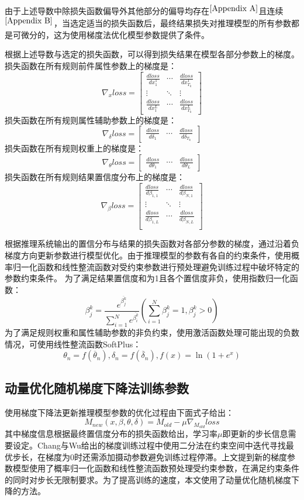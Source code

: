\documentclass{cjc}
\begin{document}
由于上述导数中除损失函数偏导外其他部分的偏导均存在$^{\ref{Appendix A}}$且连续$^{\ref{Appendix B}}$，当选定适当的损失函数后，最终结果损失对推理模型的所有参数都是可微分的，这为使用梯度法优化模型参数提供了条件。

根据上述导数与选定的损失函数，可以得到损失结果在模型各部分参数上的梯度。
损失函数在所有规则前件属性参数上的梯度是：
$$\nabla_{x}loss=\left[\begin{matrix}
            \frac{dloss}{dx_1^1} & \cdots & \frac{dloss}{dx_{T_k}^1} \\
            \vdots               & \ddots & \vdots                   \\
            \frac{dloss}{dx_1^L} & \cdots & \frac{dloss}{dx_{T_k}^L}
        \end{matrix}\right]$$
损失函数在所有规则属性辅助参数上的梯度是：
$$\nabla_{\delta}loss=\left[\begin{matrix}
            \frac{dloss}{d\delta_1} & \cdots & \frac{dloss}{d\delta_{T_k}}
        \end{matrix}\right]$$
损失函数在所有规则权重上的梯度是：
$$\nabla_{\theta}loss=\left[\begin{matrix}
            \frac{dloss}{d\theta_1} & \cdots & \frac{dloss}{d\theta_L}
        \end{matrix}\right]$$
损失函数在所有规则结果置信度分布上的梯度是：
$$\nabla_{\beta}loss=\left[\begin{matrix}
            \frac{dloss}{d\beta_{1,1}} & \cdots & \frac{dloss}{d\beta_{N,1}} \\
            \vdots                     & \ddots & \vdots                     \\
            \frac{dloss}{d\beta_{1,L}} & \cdots & \frac{dloss}{d\beta_{N,L}} \\
        \end{matrix}\right]$$

根据推理系统输出的置信分布与结果的损失函数对各部分参数的梯度，通过沿着负梯度方向更新参数进行模型优化。由于推理模型的参数有各自的约束条件，使用概率归一化函数和线性整流函数对受约束参数进行预处理避免训练过程中破坏特定的参数约束条件。
为了满足结果置信度和为1且各个置信度非负，使用指数归一化函数：
$$\beta_j^k=\frac{e^{\overline{\beta_j^k}}}{\sum_{i=1}^Ne^{\overline{\beta_i^k}}}(\sum_{i=1}^N\beta_j^k=1,\beta_j^k>0)$$
为了满足规则权重和属性辅助参数的非负约束，使用激活函数处理可能出现的负数情况，可使用线性整流函数SoftPlus：
$$\theta_n=f(\overline{\theta}_n),\delta_n=f(\overline{\delta}_n),f(x)=\ln(1+e^x)$$
\subsection{动量优化随机梯度下降法训练参数}
使用梯度下降法更新推理模型参数的优化过程由下面式子给出：
$$M_{new}(x,\beta,\theta,\delta)=M_{old}-\mu\nabla_{M_{old}}loss$$
其中梯度信息根据最终置信度分布的损失函数给出，学习率$\mu$即更新的步长信息需要设定。Chang\cite{a10}与Wu\cite{a12}给出的梯度训练过程中使用二分法在约束空间中迭代寻找最优步长，在梯度为0时还需添加摄动参数避免训练过程停滞。上文提到新的梯度参数模型使用了概率归一化函数和线性整流函数预处理受约束参数，在满足约束条件的同时对步长无限制要求。为了提高训练的速度，本文使用了动量优化随机梯度下降的方法。
\end{document}
